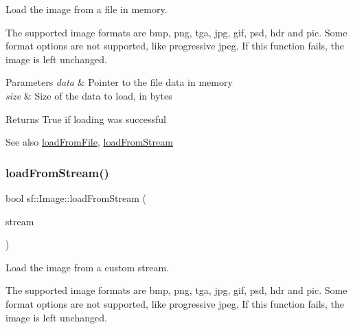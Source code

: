 Load the image from a file in memory. 

The supported image formats are bmp, png, tga, jpg, gif, psd, hdr and pic. Some format options are not supported, like progressive jpeg. If this function fails, the image is left unchanged.


\begin{DoxyParams}{Parameters}
{\em data} & Pointer to the file data in memory \\
\hline
{\em size} & Size of the data to load, in bytes\\
\hline
\end{DoxyParams}
\begin{DoxyReturn}{Returns}
True if loading was successful
\end{DoxyReturn}
\begin{DoxySeeAlso}{See also}
\mbox{\hyperlink{classsf_1_1_image_a9e4f2aa8e36d0cabde5ed5a4ef80290b}{load\+From\+File}}, \mbox{\hyperlink{classsf_1_1_image_a21122ded0e8368bb06ed3b9acfbfb501}{load\+From\+Stream}} \begin{DoxyVerb}\end{DoxyVerb}
 
\end{DoxySeeAlso}
\mbox{\label{classsf_1_1_image_a21122ded0e8368bb06ed3b9acfbfb501}} 
\subsubsection{\texorpdfstring{loadFromStream()}{loadFromStream()}}
{\footnotesize\ttfamily bool sf\+::\+Image\+::load\+From\+Stream (\begin{DoxyParamCaption}\item[{\mbox{\hyperlink{classsf_1_1_input_stream}{Input\+Stream}} \&}]{stream }\end{DoxyParamCaption})}



Load the image from a custom stream. 

The supported image formats are bmp, png, tga, jpg, gif, psd, hdr and pic. Some format options are not supported, like progressive jpeg. If this function fails, the image is left unchanged.


